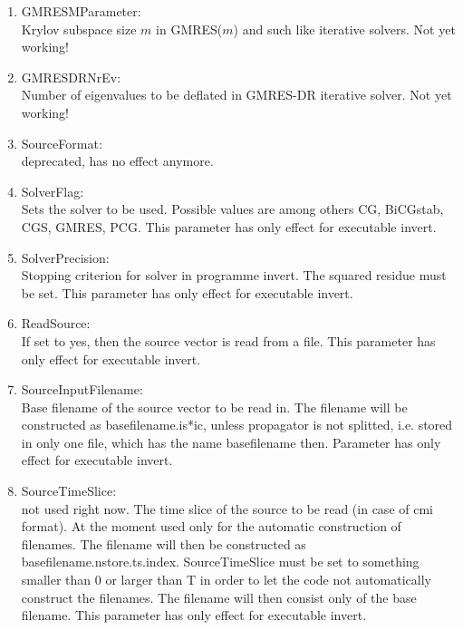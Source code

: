 \begin{enumerate}
\item {\ttfamily GMRESMParameter}:\\
  Krylov subspace size $m$ in GMRES($m$) and such like iterative
  solvers. Not yet working!

\item {\ttfamily GMRESDRNrEv}:\\
  Number of eigenvalues to be deflated in GMRES-DR iterative
  solver. Not yet working!

\item {\ttfamily SourceFormat}:\\
  deprecated, has no effect anymore.

\item {\ttfamily SolverFlag}:\\
  Sets the solver to be used. Possible values are among others
  {\ttfamily CG, BiCGstab, CGS, GMRES, PCG}. This parameter has only
  effect for executable {\ttfamily invert}.

\item {\ttfamily SolverPrecision}:\\
  Stopping criterion for solver in programme invert. The squared
  residue must be set. This parameter has only
  effect for executable {\ttfamily invert}.

\item {\ttfamily ReadSource}:\\
  If set to yes, then the source vector is read from a file. This
  parameter has only effect for executable {\ttfamily invert}.

\item {\ttfamily SourceInputFilename}:\\
  Base filename of the source vector to be read in. The filename will
  be constructed as {\ttfamily basefilename.is*ic},
  unless propagator is not splitted, i.e. stored in only one file,
  which has the name {\ttfamily basefilename} then.
  Parameter has only effect for executable {\ttfamily invert}.

\item {\ttfamily SourceTimeSlice}:\\
  not used right now.
  The time slice of the source to be read (in case of cmi format). At
  the moment used only for
  the automatic construction of filenames. The filename will then be
  constructed as {\ttfamily basefilename.nstore.ts.index}.
  {\ttfamily SourceTimeSlice} must be set to something
  smaller than 0 or larger than T in order to let the code not
  automatically construct the filenames. The filename will then
  consist only of the base filename. This parameter has only
  effect for executable {\ttfamily invert}.


\end{enumerate}
